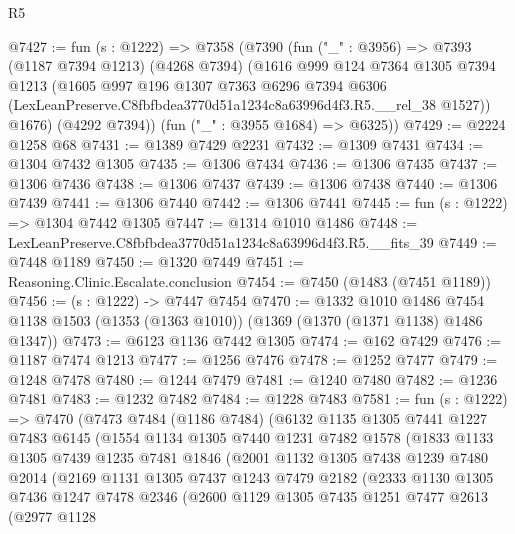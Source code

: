 \begin{lexlean}{R5}
\begin{coremodule}
@7427 := fun (s : @1222) =>
  @7358
    (@7390
      (fun ("_" : @3956) =>
      @7393
        (@1187 @7394 @1213)
        (@4268 @7394)
        (@1616
          @999
          @124
          @7364
          @1305
          @7394
          @1213
          (@1605
            @997
            @196
            @1307
            @7363
            @6296
            @7394
            @6306
            (LexLeanPreserve.C8fbfbdea3770d51a1234c8a63996d4f3.R5.__rel_38 @1527))
          @1676)
        (@4292 @7394))
      (fun ("_" : @3955 @1684) => @6325))
@7429 := @2224 @1258 @68
@7431 := @1389 @7429 @2231
@7432 := @1309 @7431
@7434 := @1304 @7432 @1305
@7435 := @1306 @7434
@7436 := @1306 @7435
@7437 := @1306 @7436
@7438 := @1306 @7437
@7439 := @1306 @7438
@7440 := @1306 @7439
@7441 := @1306 @7440
@7442 := @1306 @7441
@7445 := fun (s : @1222) => @1304 @7442 @1305
@7447 := @1314 @1010 @1486
@7448 := LexLeanPreserve.C8fbfbdea3770d51a1234c8a63996d4f3.R5.__fits_39
@7449 := @7448 @1189
@7450 := @1320 @7449
@7451 := Reasoning.Clinic.Escalate.conclusion
@7454 := @7450 (@1483 (@7451 @1189))
@7456 := (s : @1222) -> @7447 @7454
@7470 := @1332
    @1010
    @1486
    @7454
    @1138
    @1503
    (@1353 (@1363 @1010))
    (@1369 (@1370 (@1371 @1138) @1486 @1347))
@7473 := @6123 @1136 @7442 @1305
@7474 := @162 @7429
@7476 := @1187 @7474 @1213
@7477 := @1256 @7476
@7478 := @1252 @7477
@7479 := @1248 @7478
@7480 := @1244 @7479
@7481 := @1240 @7480
@7482 := @1236 @7481
@7483 := @1232 @7482
@7484 := @1228 @7483
@7581 := fun (s : @1222) =>
  @7470
    (@7473
      @7484
      (@1186 @7484)
      (@6132
        @1135
        @1305
        @7441
        @1227
        @7483
        @6145
        (@1554
          @1134
          @1305
          @7440
          @1231
          @7482
          @1578
          (@1833
            @1133
            @1305
            @7439
            @1235
            @7481
            @1846
            (@2001
              @1132
              @1305
              @7438
              @1239
              @7480
              @2014
              (@2169
                @1131
                @1305
                @7437
                @1243
                @7479
                @2182
                (@2333
                  @1130
                  @1305
                  @7436
                  @1247
                  @7478
                  @2346
                  (@2600
                    @1129
                    @1305
                    @7435
                    @1251
                    @7477
                    @2613
                    (@2977
                      @1128

\end{coremodule}
\end{lexlean}
